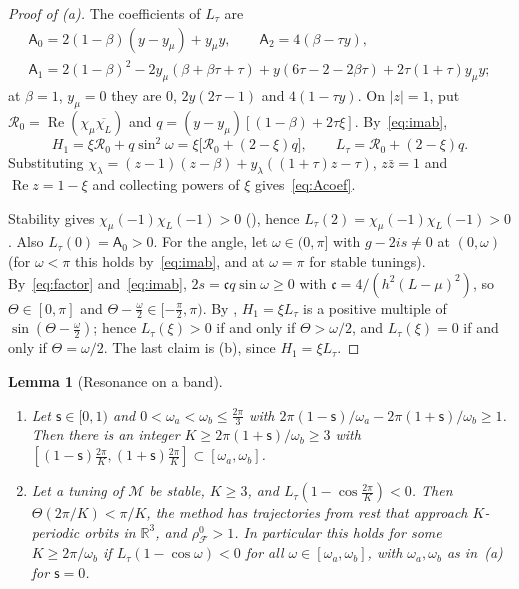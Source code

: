 \documentclass[11pt]{article}
\newtheorem{lemma}[theorem]{Lemma}
\theoremstyle{definition}
\theoremstyle{remark}
\newcommand{\R}{\mathbb R}
\newcommand{\cF}{\mathcal F}
\newcommand{\cM}{\mathcal M}
\newcommand{\Rea}{\operatorname{Re}}
\newcommand{\rhoz}{\rho_{\cF}^{0}}
\begin{document}
\begin{proof}[Proof of (a)]
The coefficients of \(L_\tau\) are
\begin{equation}\label{eq:Acoef}
\begin{gathered}
\mathsf A_0=2(1-\beta)(y-y_\mu)+y_\mu y,\qquad \mathsf A_2=4(\beta-\tau y),\\
\mathsf A_1=2(1-\beta)^2-2y_\mu(\beta+\beta\tau+\tau)+y(6\tau-2-2\beta\tau)+2\tau(1+\tau)y_\mu y ;
\end{gathered}
\end{equation}
at \(\beta=1\), \(y_\mu=0\) they are \(0\), \(2y(2\tau-1)\) and \(4(1-\tau y)\).  On \(|z|=1\), put
\(\mathcal R_0=\Rea(\chi_\mu\overline{\chi_L})\) and
\(q=(y-y_\mu)[(1-\beta)+2\tau\xi]\).
By~\eqref{eq:imab},
\[
H_1=\xi\mathcal R_0+q\sin^2\omega
=\xi\bigl[\mathcal R_0+(2-\xi)q\bigr],
\qquad L_\tau=\mathcal R_0+(2-\xi)q.
\]
Substituting \(\chi_\lambda=(z-1)(z-\beta)+y_\lambda((1+\tau)z-\tau)\),
\(z\bar z=1\) and \(\Rea z=1-\xi\) and collecting powers of \(\xi\)
gives~\eqref{eq:Acoef}.

Stability gives \(\chi_\mu(-1)\chi_L(-1)>0\) (), hence
\(L_\tau(2)=\chi_\mu(-1)\chi_L(-1)>0\).  Also \(L_\tau(0)=\mathsf A_0>0\).  For the
angle, let \(\omega\in(0,\pi]\) with \(g-2is\ne0\) at \((0,\omega)\) (for \(\omega<\pi\) this holds by~\eqref{eq:imab}, and at \(\omega=\pi\) for stable
tunings).  By~\eqref{eq:factor} and~\eqref{eq:imab}, \(2s=\mathfrak c q\sin\omega\ge0\) with \(\mathfrak c=4/(h^2(L-\mu)^2)\), so \(\Theta\in[0,\pi]\) and
\(\Theta-\frac\omega2\in[-\frac\pi2,\pi)\).  By , \(H_1=\xi L_\tau\) is a positive multiple of \(\sin(\Theta-\frac\omega2)\); hence \(L_\tau(\xi)>0\) if
and only if \(\Theta>\omega/2\), and \(L_\tau(\xi)=0\) if and only if \(\Theta=\omega/2\).  The last claim is (b), since \(H_1=\xi L_\tau\).
\end{proof}
\begin{lemma}[Resonance on a band]\label{lem:band}
\leavevmode
\begin{enumerate}[label=\textup{(\alph*)}]
\item Let \(\mathsf s\in[0,1)\) and \(0<\omega_a<\omega_b\le\frac{2\pi}3\) with \(2\pi(1-\mathsf s)/\omega_a-2\pi(1+\mathsf s)/\omega_b\ge1\).  Then there is an
integer \(K\ge2\pi(1+\mathsf s)/\omega_b\ge3\) with \([(1-\mathsf s)\frac{2\pi}K,(1+\mathsf s)\frac{2\pi}K]\subset[\omega_a,\omega_b]\).
\item Let a tuning of \(\cM\) be stable, \(K\ge3\), and \(L_\tau(1-\cos\frac{2\pi}K)<0\).  Then \(\Theta(2\pi/K)<\pi/K\), the method has trajectories
from rest that approach \(K\)-periodic orbits in \(\R^3\), and \(\rhoz>1\).  In particular this holds for some \(K\ge2\pi/\omega_b\) if
\(L_\tau(1-\cos\omega)<0\) for all \(\omega\in[\omega_a,\omega_b]\), with \(\omega_a,\omega_b\) as in~(a) for \(\mathsf s=0\).
\end{enumerate}
\end{lemma}
\end{document}
